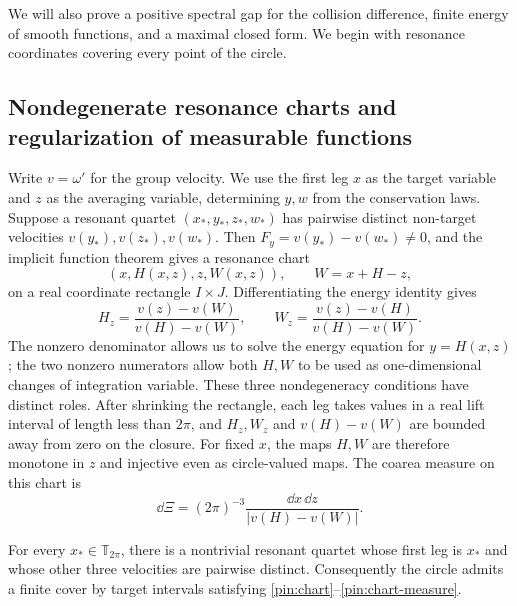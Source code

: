 We will also prove a positive spectral gap for the collision difference,
finite energy of smooth functions, and a maximal closed form.
We begin with resonance coordinates covering every point of the circle.

\subsection{Nondegenerate resonance charts and regularization of measurable functions}
\label{pin:atlas}

Write $v=\omega'$ for the group velocity. We use the first leg $x$ as
the target variable and $z$ as the averaging variable, determining
$y,w$ from the conservation laws. Suppose a resonant quartet
$(x_*,y_*,z_*,w_*)$ has pairwise distinct non-target velocities
$v(y_*),v(z_*),v(w_*)$. Then
$F_y=v(y_*)-v(w_*)\ne0$, and the implicit function theorem gives a
resonance chart
\begin{equation}
 (x,H(x,z),z,W(x,z)),\qquad W=x+H-z,
 \label{pin:chart}
\end{equation}
on a real coordinate rectangle $I\times J$. Differentiating the
energy identity gives
\begin{equation}
 H_z=\frac{v(z)-v(W)}{v(H)-v(W)},\qquad
 W_z=\frac{v(z)-v(H)}{v(H)-v(W)}.
 \label{pin:chart-derivatives}
\end{equation}
The nonzero denominator allows us to solve the energy equation for
$y=H(x,z)$; the two nonzero numerators allow both $H,W$ to be used
as one-dimensional changes of integration variable. These three
nondegeneracy conditions have distinct roles. After shrinking the
rectangle, each leg takes values in a real lift interval of length
less than $2\pi$, and $H_z,W_z$ and $v(H)-v(W)$ are bounded away
from zero on the closure. For fixed $x$, the maps $H,W$ are therefore
monotone in $z$ and injective even as circle-valued maps. The coarea
measure on this chart is
\begin{equation}
              \dd\Xi=(2\pi)^{-3}
                  \frac{\dd x\,\dd z}{|v(H)-v(W)|}.
 \label{pin:chart-measure}
\end{equation}

\begin{lemma}
\label{pin:all-charts}
For every $x_*\in\mathbb T_{2\pi}$, there is a nontrivial resonant
quartet whose first leg is $x_*$ and whose other three velocities are
pairwise distinct. Consequently the circle admits a finite cover by
target intervals satisfying
\eqref{pin:chart}--\eqref{pin:chart-measure}.
\end{lemma}

